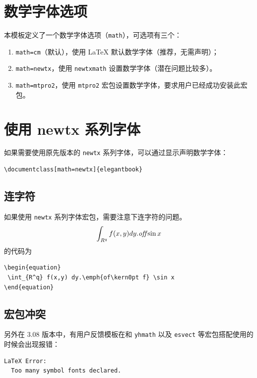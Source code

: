 \documentclass[lang=cn,newtx,10pt,scheme=chinese,pad,twocol]{zznote}
\begin{document}
\section{数学字体选项}

本模板定义了一个数学字体选项（\lstinline{math}），可选项有三个：
\begin{enumerate}
	\item \lstinline{math=cm}（默认），使用 \LaTeX{} 默认数学字体（推荐，无需声明）；
	\item \lstinline{math=newtx}，使用 \lstinline{newtxmath} 设置数学字体（潜在问题比较多）。
	\item \lstinline{math=mtpro2}，使用 \lstinline{mtpro2} 宏包设置数学字体，要求用户已经成功安装此宏包。
\end{enumerate}

\section{使用 newtx 系列字体}

如果需要使用原先版本的 \lstinline{newtx} 系列字体，可以通过显示声明数学字体：

\begin{lstlisting}
\documentclass[math=newtx]{elegantbook}
\end{lstlisting}

\subsection{连字符}

如果使用 \lstinline{newtx} 系列字体宏包，需要注意下连字符的问题。
\begin{equation}
	\int_{R^q} f(x,y) dy.\emph{of\kern0pt f} \sin x
\end{equation}
的代码为
\begin{lstlisting}
\begin{equation}
 \int_{R^q} f(x,y) dy.\emph{of\kern0pt f} \sin x
\end{equation}
\end{lstlisting}

\subsection{宏包冲突}

另外在 3.08 版本中，有用户反馈模板在和 \lstinline{yhmath} 以及 \lstinline{esvect} 等宏包搭配使用的时候会出现报错：
\begin{lstlisting}
LaTeX Error:
  Too many symbol fonts declared.
\end{lstlisting}
\end{document}
